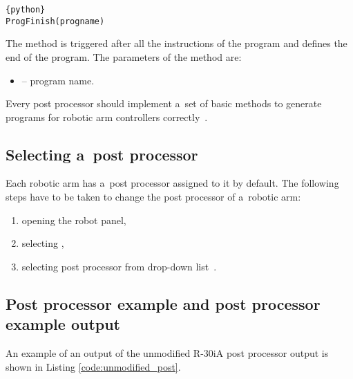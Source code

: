 \begin{lstlisting}[frame=lines,numbers=none,breaklines=true]{python}
ProgFinish(progname)
\end{lstlisting}
The  method is triggered after all the instructions of the program and defines the end of the program. The parameters of the  method are:

\begin{itemize}

\item {} -- program name.

\end{itemize}
 Every post processor should implement a~set of basic methods to generate programs for robotic arm controllers correctly~\cite{postmethods}.


\subsection{Selecting a~post processor}

Each robotic arm has a~post processor assigned to it by default. The following steps have to be taken to change the post processor of a~robotic arm:


\begin{enumerate}
    \item opening the robot panel,
    \item selecting ,
    \item selecting post processor from drop-down list~\cite{selectpost}.
\end{enumerate}

\subsection{Post processor example and post processor example output}

An example of an output of the unmodified R-30iA post processor output is shown in Listing \ref{code:unmodified_post}.


